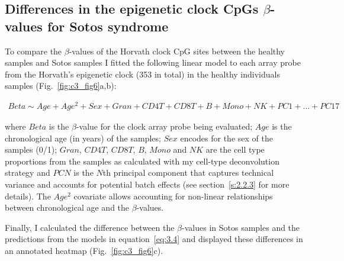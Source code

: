 \subsection*{Differences in the epigenetic clock CpGs $\beta$-values for Sotos syndrome}

To compare the $\beta$-values of the Horvath clock CpG sites between the healthy samples and Sotos samples I fitted the following linear model to each array probe from the Horvath's epigenetic clock (353 in total) in the healthy individuals samples (Fig.~\ref{fig:c3_fig6}a,b):

\begin{align} \label{eq:3.4}
Beta \sim Age+Age^2+Sex+Gran+CD4T+CD8T+B+Mono+NK+PC1+... +PC17
\end{align}

where $Beta$ is the $\beta$-value for the clock array probe being evaluated; $Age$ is the chronological age (in years) of the samples; $Sex$ encodes for the sex of the samples (0/1); $Gran$, $CD4T$, $CD8T$, $B$, $Mono$ and $NK$ are the cell type proportions from the samples as calculated with my cell-type deconvolution strategy and $PCN$ is the $N$th principal component that captures technical variance and accounts for potential batch effects (see section~\ref{s:2.2.3} for more details). The $Age^2$ covariate allows accounting for non-linear relationships between chronological age and the $\beta$-values.

\bigskip

Finally, I calculated the difference between the $\beta$-values in Sotos samples and the predictions from the models in equation~\ref{eq:3.4} and displayed these differences in an annotated heatmap (Fig.~\ref{fig:c3_fig6}c).   

